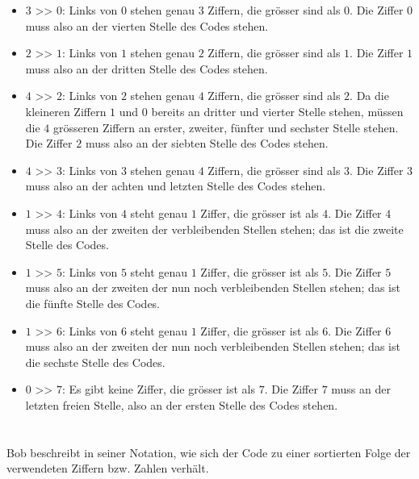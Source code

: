 {{\begin{itemize}
  \item $3$ >\textcompwordmark{}> $0$:  Links von $0$ stehen genau $3$ Ziffern, die grösser sind als $0$.
Die Ziffer $0$ muss also an der vierten Stelle des Codes stehen.
  \item $2$ >\textcompwordmark{}> $1$:  Links von $1$ stehen genau $2$ Ziffern, die grösser sind als $1$.
Die Ziffer $1$ muss also an der dritten Stelle des Codes stehen.
  \item $4$ >\textcompwordmark{}> $2$:  Links von $2$ stehen genau $4$ Ziffern, die grösser sind als $2$.
Da die kleineren Ziffern $1$ und $0$ bereits an dritter und vierter Stelle stehen,
müssen die $4$ grösseren Ziffern an erster, zweiter, fünfter und sechster Stelle stehen.
Die Ziffer $2$ muss also an der siebten Stelle des Codes stehen.
  \item $4$ >\textcompwordmark{}> $3$:  Links von $3$ stehen genau $4$ Ziffern, die grösser sind als $3$.
Die Ziffer $3$ muss also an der achten und letzten Stelle des Codes stehen.
  \item $1$ >\textcompwordmark{}> $4$:  Links von $4$ steht genau $1$ Ziffer, die grösser ist als $4$.
Die Ziffer $4$ muss also an der zweiten der verbleibenden Stellen stehen; das ist die zweite Stelle des Codes.
  \item $1$ >\textcompwordmark{}> $5$:  Links von $5$ steht genau $1$ Ziffer, die grösser ist als $5$.
Die Ziffer $5$ muss also an der zweiten der nun noch verbleibenden Stellen stehen; das ist die fünfte Stelle des Codes.
  \item $1$ >\textcompwordmark{}> $6$:  Links von $6$ steht genau $1$ Ziffer, die grösser ist als $6$.
Die Ziffer $6$ muss also an der zweiten der nun noch verbleibenden Stellen stehen; das ist die sechste Stelle des Codes.
  \item $0$ >\textcompwordmark{}> $7$:  Es gibt keine Ziffer, die grösser ist als $7$.
Die Ziffer $7$ muss an der letzten freien Stelle, also an der ersten Stelle des Codes stehen.
\end{itemize}



\section*{\BrochureItsInformatics}
Bob beschreibt in seiner Notation, wie sich der Code zu einer sortierten Folge der verwendeten Ziffern bzw. Zahlen verhält.

}}
